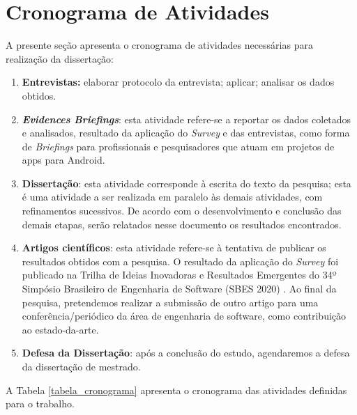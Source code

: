 \section{Cronograma de Atividades}

A presente seção apresenta o cronograma de atividades necessárias para realização da dissertação:

\begin{enumerate}[label=\bf AT\arabic*,leftmargin=1.7cm]

    \item \textbf{Entrevistas:} elaborar protocolo da entrevista; aplicar; analisar os dados obtidos.
    
    \item \textbf {\textit{Evidences Briefings}}: esta atividade refere-se a reportar os dados coletados e analisados, resultado da aplicação do \textit{Survey} e das entrevistas, como forma de \textit{Briefings} para profissionais e pesquisadores que atuam em projetos de apps para Android. 
    
    \item \textbf{Dissertação}: esta atividade corresponde à escrita do texto da pesquisa; esta é uma atividade a ser realizada em paralelo às demais atividades, com refinamentos sucessivos. De acordo com o desenvolvimento e conclusão das demais etapas, serão relatados nesse documento os resultados encontrados.
    
    \item \textbf{Artigos científicos}: esta atividade refere-se à tentativa de publicar os resultados obtidos com a pesquisa. O resultado da aplicação do \textit{Survey} foi publicado na Trilha de Ideias Inovadoras e Resultados Emergentes do 34º Simpósio Brasileiro de Engenharia de Software (SBES 2020) \citep{Sara:2020}. Ao final da pesquisa, pretendemos realizar a submissão de outro artigo para uma conferência/periódico da área de engenharia de software, como contribuição ao estado-da-arte.
    
    \item \textbf{Defesa da Dissertação}: após a conclusão do estudo, agendaremos a defesa da dissertação de mestrado. 

\end{enumerate}

A Tabela \ref{tabela_cronograma} apresenta o cronograma das atividades definidas para o trabalho.

